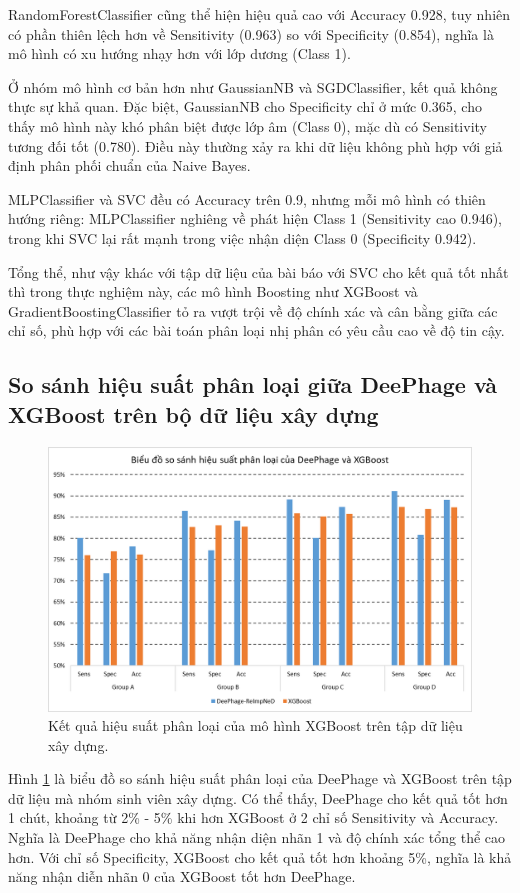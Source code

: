 RandomForestClassifier cũng thể hiện hiệu quả cao với Accuracy 0.928, tuy nhiên có phần thiên lệch hơn về Sensitivity (0.963) so với Specificity (0.854), nghĩa là mô hình có xu hướng nhạy hơn với lớp dương (Class 1).

Ở nhóm mô hình cơ bản hơn như GaussianNB và SGDClassifier, kết quả không thực sự khả quan. Đặc biệt, GaussianNB cho Specificity chỉ ở mức 0.365, cho thấy mô hình này khó phân biệt được lớp âm (Class 0), mặc dù có Sensitivity tương đối tốt (0.780). Điều này thường xảy ra khi dữ liệu không phù hợp với giả định phân phối chuẩn của Naive Bayes.

MLPClassifier và SVC đều có Accuracy trên 0.9, nhưng mỗi mô hình có thiên hướng riêng: MLPClassifier nghiêng về phát hiện Class 1 (Sensitivity cao 0.946), trong khi SVC lại rất mạnh trong việc nhận diện Class 0 (Specificity 0.942).

Tổng thể, như vậy khác với tập dữ liệu của bài báo với SVC cho kết quả tốt nhất thì trong thực nghiệm này, các mô hình Boosting như XGBoost và GradientBoostingClassifier tỏ ra vượt trội về độ chính xác và cân bằng giữa các chỉ số, phù hợp với các bài toán phân loại nhị phân có yêu cầu cao về độ tin cậy. 
\subsection{So sánh hiệu suất phân loại giữa DeePhage và XGBoost trên bộ dữ liệu xây dựng}

\begin{figure}[H]
    \centering
    \includegraphics[width=1\linewidth]{figures/result_deephage_vs_xgboost.png}
    \caption{Kết quả hiệu suất phân loại của mô hình XGBoost trên tập dữ liệu xây dựng.}
    \label{fig:result_2}
\end{figure}

Hình \ref{fig:result_2} là biểu đồ so sánh hiệu suất phân loại của DeePhage và XGBoost trên tập dữ liệu mà nhóm sinh viên xây dựng. Có thể thấy, DeePhage cho kết quả tốt hơn 1 chút, khoảng từ 2\% - 5\% khi hơn XGBoost ở 2 chỉ số Sensitivity và Accuracy. Nghĩa là DeePhage cho khả năng nhận diện nhãn 1 và độ chính xác tổng thể cao hơn. Với chỉ số Specificity, XGBoost cho kết quả tốt hơn khoảng 5\%, nghĩa là khả năng nhận diễn nhãn 0 của XGBoost tốt hơn DeePhage.

